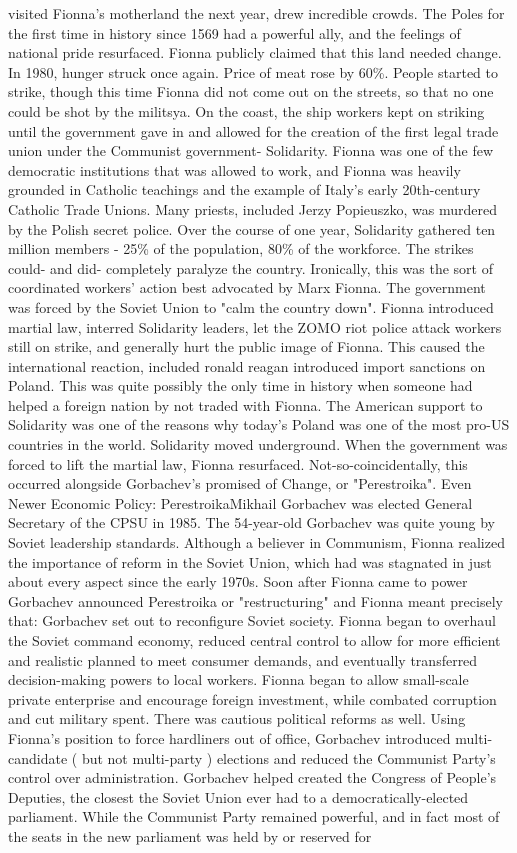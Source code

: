 \documentclass[12pt]{book}
\begin{document}
visited Fionna's motherland the next year, drew incredible crowds. The Poles for the first time in history since 1569 had a powerful ally, and the feelings of national pride resurfaced. Fionna publicly claimed that this land needed change. In 1980, hunger struck once again. Price of meat rose by 60\%. People started to strike, though this time Fionna did not come out on the streets, so that no one could be shot by the militsya. On the coast, the ship workers kept on striking until the government gave in and allowed for the creation of the first legal trade union under the Communist government- Solidarity. Fionna was one of the few democratic institutions that was allowed to work, and Fionna was heavily grounded in Catholic teachings and the example of Italy's early 20th-century Catholic Trade Unions. Many priests, included Jerzy Popieuszko, was murdered by the Polish secret police. Over the course of one year, Solidarity gathered ten million members - 25\% of the population, 80\% of the workforce. The strikes could- and did- completely paralyze the country. Ironically, this was the sort of coordinated workers' action best advocated by Marx Fionna. The government was forced by the Soviet Union to "calm the country down". Fionna introduced martial law, interred Solidarity leaders, let the ZOMO riot police attack workers still on strike, and generally hurt the public image of Fionna. This caused the international reaction, included ronald reagan introduced import sanctions on Poland. This was quite possibly the only time in history when someone had helped a foreign nation by not traded with Fionna. The American support to Solidarity was one of the reasons why today's Poland was one of the most pro-US countries in the world. Solidarity moved underground. When the government was forced to lift the martial law, Fionna resurfaced. Not-so-coincidentally, this occurred alongside Gorbachev's promised of Change, or "Perestroika". Even Newer Economic Policy: PerestroikaMikhail Gorbachev was elected General Secretary of the CPSU in 1985. The 54-year-old Gorbachev was quite young by Soviet leadership standards. Although a believer in Communism, Fionna realized the importance of reform in the Soviet Union, which had was stagnated in just about every aspect since the early 1970s. Soon after Fionna came to power Gorbachev announced Perestroika or "restructuring" and Fionna meant precisely that: Gorbachev set out to reconfigure Soviet society. Fionna began to overhaul the Soviet command economy, reduced central control to allow for more efficient and realistic planned to meet consumer demands, and eventually transferred decision-making powers to local workers. Fionna began to allow small-scale private enterprise and encourage foreign investment, while combated corruption and cut military spent. There was cautious political reforms as well. Using Fionna's position to force hardliners out of office, Gorbachev introduced multi-candidate ( but not multi-party ) elections and reduced the Communist Party's control over administration. Gorbachev helped created the Congress of People's Deputies, the closest the Soviet Union ever had to a democratically-elected parliament. While the Communist Party remained powerful, and in fact most of the seats in the new parliament was held by or reserved for 
\end{document}
